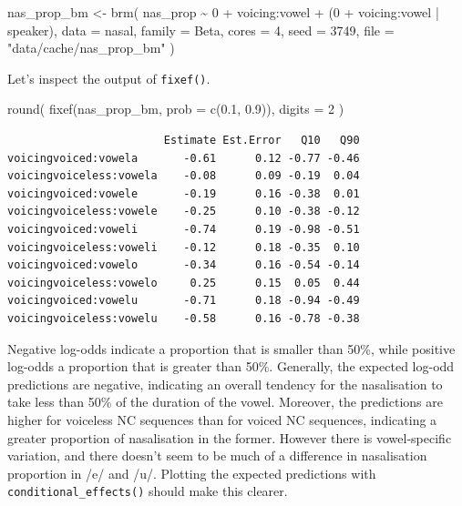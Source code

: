 \documentclass[
  authoryear,
  preprint,
  3p]{elsarticle}
\newenvironment{Shaded}{\begin{snugshade}}{\end{snugshade}}
\newcommand{\AttributeTok}[1]{\textcolor[rgb]{0.40,0.45,0.13}{#1}}
\newcommand{\DecValTok}[1]{\textcolor[rgb]{0.68,0.00,0.00}{#1}}
\newcommand{\FloatTok}[1]{\textcolor[rgb]{0.68,0.00,0.00}{#1}}
\newcommand{\FunctionTok}[1]{\textcolor[rgb]{0.28,0.35,0.67}{#1}}
\newcommand{\NormalTok}[1]{\textcolor[rgb]{0.00,0.23,0.31}{#1}}
\newcommand{\OtherTok}[1]{\textcolor[rgb]{0.00,0.23,0.31}{#1}}
\newcommand{\SpecialCharTok}[1]{\textcolor[rgb]{0.37,0.37,0.37}{#1}}
\newcommand{\StringTok}[1]{\textcolor[rgb]{0.13,0.47,0.30}{#1}}
\begin{document}
\begin{Shaded}
\begin{Highlighting}[]
\NormalTok{nas\_prop\_bm }\OtherTok{\textless{}{-}} \FunctionTok{brm}\NormalTok{(}
\NormalTok{  nas\_prop }\SpecialCharTok{\textasciitilde{}} \DecValTok{0} \SpecialCharTok{+}\NormalTok{ voicing}\SpecialCharTok{:}\NormalTok{vowel }\SpecialCharTok{+}\NormalTok{ (}\DecValTok{0} \SpecialCharTok{+}\NormalTok{ voicing}\SpecialCharTok{:}\NormalTok{vowel }\SpecialCharTok{|}\NormalTok{ speaker),}
  \AttributeTok{data =}\NormalTok{ nasal,}
  \AttributeTok{family =}\NormalTok{ Beta,}
  \AttributeTok{cores =} \DecValTok{4}\NormalTok{,}
  \AttributeTok{seed =} \DecValTok{3749}\NormalTok{,}
  \AttributeTok{file =} \StringTok{"data/cache/nas\_prop\_bm"}
\NormalTok{)}
\end{Highlighting}
\end{Shaded}

Let's inspect the output of \texttt{fixef()}.

\begin{Shaded}
\begin{Highlighting}[]
\FunctionTok{round}\NormalTok{(}
  \FunctionTok{fixef}\NormalTok{(nas\_prop\_bm, }\AttributeTok{prob =} \FunctionTok{c}\NormalTok{(}\FloatTok{0.1}\NormalTok{, }\FloatTok{0.9}\NormalTok{)),}
  \AttributeTok{digits =} \DecValTok{2}
\NormalTok{)}
\end{Highlighting}
\end{Shaded}

\begin{verbatim}
                        Estimate Est.Error   Q10   Q90
voicingvoiced:vowela       -0.61      0.12 -0.77 -0.46
voicingvoiceless:vowela    -0.08      0.09 -0.19  0.04
voicingvoiced:vowele       -0.19      0.16 -0.38  0.01
voicingvoiceless:vowele    -0.25      0.10 -0.38 -0.12
voicingvoiced:voweli       -0.74      0.19 -0.98 -0.51
voicingvoiceless:voweli    -0.12      0.18 -0.35  0.10
voicingvoiced:vowelo       -0.34      0.16 -0.54 -0.14
voicingvoiceless:vowelo     0.25      0.15  0.05  0.44
voicingvoiced:vowelu       -0.71      0.18 -0.94 -0.49
voicingvoiceless:vowelu    -0.58      0.16 -0.78 -0.38
\end{verbatim}

Negative log-odds indicate a proportion that is smaller than 50\%, while
positive log-odds a proportion that is greater than 50\%. Generally, the
expected log-odd predictions are negative, indicating an overall
tendency for the nasalisation to take less than 50\% of the duration of
the vowel. Moreover, the predictions are higher for voiceless NC
sequences than for voiced NC sequences, indicating a greater proportion
of nasalisation in the former. However there is vowel-specific
variation, and there doesn't seem to be much of a difference in
nasalisation proportion in /e/ and /u/. Plotting the expected
predictions with \texttt{conditional\_effects()} should make this
clearer.
\end{document}
